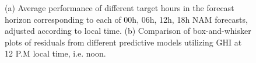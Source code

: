 \begin{figure}[ht]
    \begin{center}
	\caption[Model performance comparison at different times in a day at the target location.]{ (a) Average performance of different target hours in the forecast horizon corresponding to each of 00h, 06h, 12h, 18h NAM forecasts, adjusted according to local time. 
	(b) Comparison of box-and-whisker plots of residuals from different predictive models utilizing GHI at 12 P.M local time, i.e. noon.}
	\label{fig:local_time_analysis}
    \end{center}
\end{figure}

